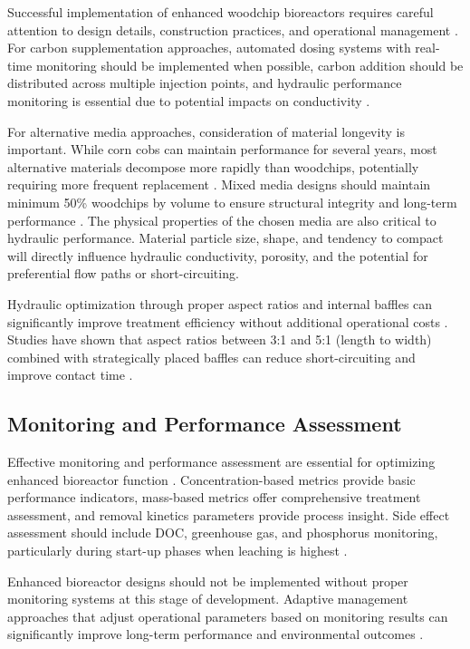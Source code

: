 \documentclass[12pt,a4paper]{article}
\begin{document}
Successful implementation of enhanced woodchip bioreactors requires careful attention to design details, construction practices, and operational management \citep{RN310, RN312}. For carbon supplementation approaches, automated dosing systems with real-time monitoring should be implemented when possible, carbon addition should be distributed across multiple injection points, and hydraulic performance monitoring is essential due to potential impacts on conductivity \citep{RN242}.

For alternative media approaches, consideration of material longevity is important. While corn cobs can maintain performance for several years, most alternative materials decompose more rapidly than woodchips, potentially requiring more frequent replacement \citep{new_ref_2}. Mixed media designs should maintain minimum 50\% woodchips by volume to ensure structural integrity and long-term performance \citep{new_ref_4}. The physical properties of the chosen media are also critical to hydraulic performance. Material particle size, shape, and tendency to compact will directly influence hydraulic conductivity, porosity, and the potential for preferential flow paths or short-circuiting.

Hydraulic optimization through proper aspect ratios and internal baffles can significantly improve treatment efficiency without additional operational costs \citep{RN309}. Studies have shown that aspect ratios between 3:1 and 5:1 (length to width) combined with strategically placed baffles can reduce short-circuiting and improve contact time \citep{RN309}.

\subsection{Monitoring and Performance Assessment}

Effective monitoring and performance assessment are essential for optimizing enhanced bioreactor function \citep{RN310, RN312}. Concentration-based metrics provide basic performance indicators, mass-based metrics offer comprehensive treatment assessment, and removal kinetics parameters provide process insight. Side effect assessment should include DOC, greenhouse gas, and phosphorus monitoring, particularly during start-up phases when leaching is highest \citep{RN625, RN1181}.

Enhanced bioreactor designs should not be implemented without proper monitoring systems at this stage of development. Adaptive management approaches that adjust operational parameters based on monitoring results can significantly improve long-term performance and environmental outcomes \citep{RN310}.
\end{document}
